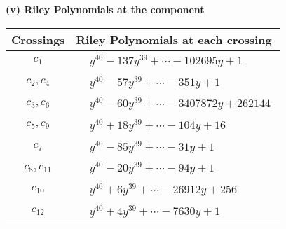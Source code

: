 \documentclass[1p]{elsarticle_modified}
\theoremstyle{definition}
\begin{document}
\newpage\renewcommand{\arraystretch}{1}
\flushleft \textbf{(v) Riley Polynomials at the component}\newline \\
\begin{tabular}{m{50pt}|m{274pt}}
Crossings & \hspace{64pt}Riley Polynomials at each crossing \\
\hline $$\begin{aligned}c_{1}\end{aligned}$$&$\begin{aligned}
&y^{40}-137 y^{39}+\cdots-102695 y+1
\end{aligned}$\\
\hline $$\begin{aligned}c_{2},c_{4}\end{aligned}$$&$\begin{aligned}
&y^{40}-57 y^{39}+\cdots-351 y+1
\end{aligned}$\\
\hline $$\begin{aligned}c_{3},c_{6}\end{aligned}$$&$\begin{aligned}
&y^{40}-60 y^{39}+\cdots-3407872 y+262144
\end{aligned}$\\
\hline $$\begin{aligned}c_{5},c_{9}\end{aligned}$$&$\begin{aligned}
&y^{40}+18 y^{39}+\cdots-104 y+16
\end{aligned}$\\
\hline $$\begin{aligned}c_{7}\end{aligned}$$&$\begin{aligned}
&y^{40}-85 y^{39}+\cdots-31 y+1
\end{aligned}$\\
\hline $$\begin{aligned}c_{8},c_{11}\end{aligned}$$&$\begin{aligned}
&y^{40}-20 y^{39}+\cdots-94 y+1
\end{aligned}$\\
\hline $$\begin{aligned}c_{10}\end{aligned}$$&$\begin{aligned}
&y^{40}+6 y^{39}+\cdots-26912 y+256
\end{aligned}$\\
\hline $$\begin{aligned}c_{12}\end{aligned}$$&$\begin{aligned}
&y^{40}+4 y^{39}+\cdots-7630 y+1
\end{aligned}$\\
\hline
\end{tabular}\\~\\
\end{document}
